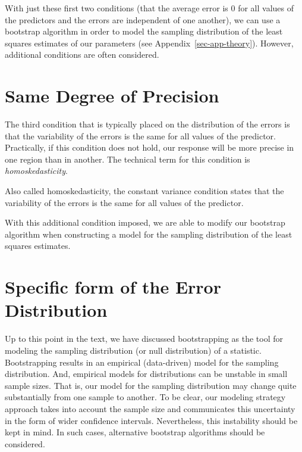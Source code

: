 \documentclass[
  letterpaper,
  DIV=11,
  numbers=noendperiod]{scrreprt}
\theoremstyle{plain}
\theoremstyle{definition}
\theoremstyle{definition}
\theoremstyle{remark}
\begin{document}
With just these first two conditions (that the average error is 0 for
all values of the predictors and the errors are independent of one
another), we can use a bootstrap algorithm in order to model the
sampling distribution of the least squares estimates of our parameters
(see Appendix~\ref{sec-app-theory}). However, additional conditions are
often considered.

\section{Same Degree of Precision}\label{same-degree-of-precision}

The third condition that is typically placed on the distribution of the
errors is that the variability of the errors is the same for all values
of the predictor. Practically, if this condition does not hold, our
response will be more precise in one region than in another. The
technical term for this condition is \emph{homoskedasticity}.

\begin{tcolorbox}[enhanced jigsaw, breakable, titlerule=0mm, colframe=quarto-callout-note-color-frame, bottomtitle=1mm, opacityback=0, rightrule=.15mm, toptitle=1mm, arc=.35mm, bottomrule=.15mm, left=2mm, title=\textcolor{quarto-callout-note-color}{\faInfo}\hspace{0.5em}{Constant Variance}, leftrule=.75mm, coltitle=black, toprule=.15mm, colbacktitle=quarto-callout-note-color!10!white, colback=white, opacitybacktitle=0.6]

Also called homoskedasticity, the constant variance condition states
that the variability of the errors is the same for all values of the
predictor.

\end{tcolorbox}

With this additional condition imposed, we are able to modify our
bootstrap algorithm when constructing a model for the sampling
distribution of the least squares estimates.

\section{Specific form of the Error
Distribution}\label{specific-form-of-the-error-distribution}

Up to this point in the text, we have discussed bootstrapping as the
tool for modeling the sampling distribution (or null distribution) of a
statistic. Bootstrapping results in an empirical (data-driven) model for
the sampling distribution. And, empirical models for distributions can
be unstable in small sample sizes. That is, our model for the sampling
distribution may change quite substantially from one sample to another.
To be clear, our modeling strategy approach takes into account the
sample size and communicates this uncertainty in the form of wider
confidence intervals. Nevertheless, this instability should be kept in
mind. In such cases, alternative bootstrap algorithms should be
considered.
\end{document}
